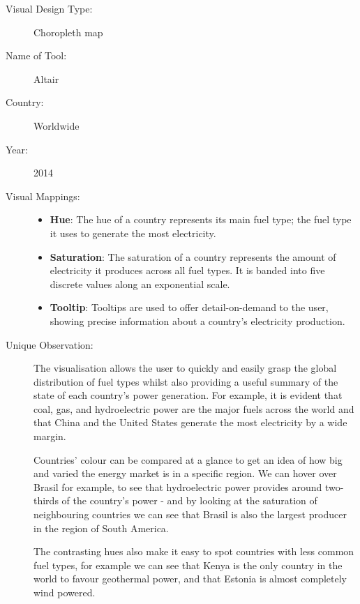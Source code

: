 \begin{description}
\item[Visual Design Type:]
Choropleth map
\item[Name of Tool:]
Altair
\item[Country:]
Worldwide
\item[Year:]
2014

\item[Visual Mappings:]
\begin{itemize}
  \item \textbf{Hue}: The hue of a country represents its main fuel type; the fuel type it uses to generate the most electricity.
  \item \textbf{Saturation}: The saturation of a country represents the amount of electricity it produces across all fuel types. It is banded into five discrete values along an exponential scale.
  \item \textbf{Tooltip}: Tooltips are used to offer detail-on-demand to the user, showing precise information about a country's electricity production. 
\end{itemize}

\item[Unique Observation:]
The visualisation allows the user to quickly and easily grasp the global distribution of fuel types whilst also providing a useful summary of the state of each country's power generation. For example, it is evident that coal, gas, and hydroelectric power are the major fuels across the world and that China and the United States generate the most electricity by a wide margin.

Countries' colour can be compared at a glance to get an idea of how big and varied the energy market is in a specific region. We can hover over Brasil for example, to see that hydroelectric power provides around two-thirds of the country's power - and by looking at the saturation of neighbouring countries we can see that Brasil is also the largest producer in the region of South America.

The contrasting hues also make it easy to spot countries with less common fuel types, for example we can see that Kenya is the only country in the world to favour geothermal power, and that Estonia is almost completely wind powered.


\end{description}
